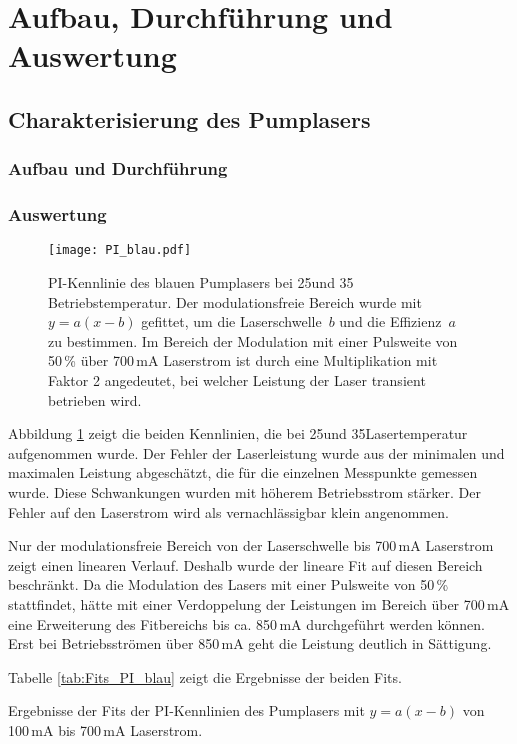 \section{Aufbau, Durchführung und Auswertung}

\subsection{Charakterisierung des Pumplasers}


\subsubsection{Aufbau und Durchführung}

\subsubsection{Auswertung}

\begin{figure}[H]
\begin{center}
  \texttt{[image: PI\_blau.pdf]}
  \caption{PI-Kennlinie des blauen Pumplasers bei 25\grad und 35\grad
  Betriebstemperatur. Der modulationsfreie Bereich wurde mit $y=a(x-b)$
  gefittet, um die Laserschwelle~$b$ und die Effizienz~$a$ zu bestimmen. Im
  Bereich der Modulation mit einer Pulsweite von 50\,\% über 700\,mA Laserstrom ist durch eine
  Multiplikation mit Faktor 2 angedeutet, bei welcher Leistung der Laser
  transient betrieben wird.}
  \label{img:PI_blau}
\end{center}
\end{figure}

Abbildung \ref{img:PI_blau} zeigt die beiden Kennlinien, die bei 25\grad und 35\grad Lasertemperatur
aufgenommen wurde.
Der Fehler der Laserleistung wurde aus der minimalen und maximalen Leistung abgeschätzt, die für die
einzelnen Messpunkte gemessen wurde.
Diese Schwankungen wurden mit höherem Betriebsstrom stärker.
Der Fehler auf den Laserstrom wird als vernachlässigbar klein angenommen.

 Nur der modulationsfreie Bereich von der Laserschwelle bis 700\,mA Laserstrom
zeigt einen linearen Verlauf.
Deshalb wurde der lineare Fit auf diesen Bereich beschränkt.
Da die Modulation des Lasers mit einer Pulsweite von 50\,\% stattfindet, hätte mit einer
Verdoppelung der Leistungen im Bereich über 700\,mA eine Erweiterung des Fitbereichs bis ca. 850\,mA
durchgeführt werden können. Erst bei Betriebsströmen über 850\,mA geht die Leistung deutlich in
Sättigung.

Tabelle \ref{tab:Fits_PI_blau} zeigt die Ergebnisse der beiden Fits.


\begin{table}[htb]
\caption{Ergebnisse der Fits der PI-Kennlinien des Pumplasers mit $y=a(x-b)$ von 100\,mA bis
700\,mA Laserstrom.}

\label{tab:Fits_PI_blau}
\end{table}

\FloatBarrier
 